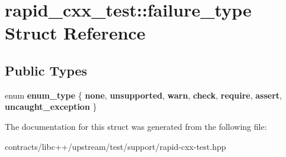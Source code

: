 \hypertarget{structrapid__cxx__test_1_1failure__type}{}\section{rapid\+\_\+cxx\+\_\+test\+:\+:failure\+\_\+type Struct Reference}
\label{structrapid__cxx__test_1_1failure__type}
\subsection*{Public Types}
\begin{DoxyCompactItemize}
\item 
\mbox{\label{structrapid__cxx__test_1_1failure__type_ae686aab77b72d1fedc6733478d67a114}} 
enum {\bfseries enum\+\_\+type} \{ \newline
{\bfseries none}, 
{\bfseries unsupported}, 
{\bfseries warn}, 
{\bfseries check}, 
\newline
{\bfseries require}, 
{\bfseries assert}, 
{\bfseries uncaught\+\_\+exception}
 \}
\end{DoxyCompactItemize}


The documentation for this struct was generated from the following file\+:\begin{DoxyCompactItemize}
\item 
contracts/libc++/upstream/test/support/rapid-\/cxx-\/test.\+hpp\end{DoxyCompactItemize}
